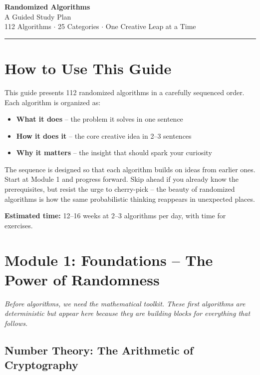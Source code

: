 \documentclass[11pt,a4paper]{article}
\begin{document}
\begin{center}
{\LARGE\bfseries\color{blue!70!black} Randomized Algorithms}\\[6pt]
{\Large A Guided Study Plan}\\[4pt]
{\large 112 Algorithms \(\cdot\) 25 Categories \(\cdot\) One Creative Leap at a Time}\\[8pt]
\rule{0.6\textwidth}{0.5pt}
\end{center}

\section*{How to Use This Guide}

This guide presents 112 randomized algorithms in a carefully sequenced order. Each algorithm is organized as:

\begin{itemize}[nosep]
    \item \textbf{What it does} -- the problem it solves in one sentence
    \item \textbf{How it does it} -- the core creative idea in 2--3 sentences
    \item \textbf{Why it matters} -- the insight that should spark your curiosity
\end{itemize}

\noindent The sequence is designed so that each algorithm builds on ideas from earlier ones. Start at Module 1 and progress forward. Skip ahead if you already know the prerequisites, but resist the urge to cherry-pick -- the beauty of randomized algorithms is how the same probabilistic thinking reappears in unexpected places.

\vspace{1em}
\noindent\textbf{Estimated time:} 12--16 weeks at 2--3 algorithms per day, with time for exercises.

\section{Module 1: Foundations -- The Power of Randomness}
\label{sec:foundations}

\textit{Before algorithms, we need the mathematical toolkit. These first algorithms are deterministic but appear here because they are building blocks for everything that follows.}

\subsection{Number Theory: The Arithmetic of Cryptography}
\end{document}
